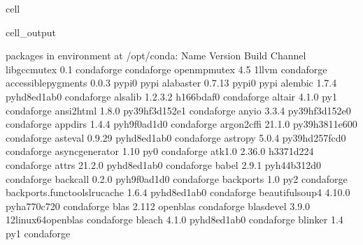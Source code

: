 \documentclass[letterpaper,table,10pt,english]{jupyterBook}
\begin{document}
\begin{sphinxuseclass}{cell}
\begin{sphinxVerbatimOutput}
\begin{sphinxuseclass}{cell_output}
\begin{sphinxVerbatim}[commandchars=\\\{\}]
\PYGZsh{} packages in environment at /opt/conda:
\PYGZsh{}
\PYGZsh{} Name                    Version                   Build  Channel
\PYGZus{}libgcc\PYGZus{}mutex             0.1                 conda\PYGZus{}forge    conda\PYGZhy{}forge
\PYGZus{}openmp\PYGZus{}mutex             4.5                      1\PYGZus{}llvm    conda\PYGZhy{}forge
accessible\PYGZhy{}pygments       0.0.3                    pypi\PYGZus{}0    pypi
alabaster                 0.7.13                   pypi\PYGZus{}0    pypi
alembic                   1.7.4              pyhd8ed1ab\PYGZus{}0    conda\PYGZhy{}forge
alsa\PYGZhy{}lib                  1.2.3.2              h166bdaf\PYGZus{}0    conda\PYGZhy{}forge
altair                    4.1.0                      py\PYGZus{}1    conda\PYGZhy{}forge
ansi2html                 1.8.0            py39hf3d152e\PYGZus{}1    conda\PYGZhy{}forge
anyio                     3.3.4            py39hf3d152e\PYGZus{}0    conda\PYGZhy{}forge
appdirs                   1.4.4              pyh9f0ad1d\PYGZus{}0    conda\PYGZhy{}forge
argon2\PYGZhy{}cffi               21.1.0           py39h3811e60\PYGZus{}0    conda\PYGZhy{}forge
asteval                   0.9.29             pyhd8ed1ab\PYGZus{}0    conda\PYGZhy{}forge
astropy                   5.0.4            py39hd257fcd\PYGZus{}0    conda\PYGZhy{}forge
async\PYGZus{}generator           1.10                       py\PYGZus{}0    conda\PYGZhy{}forge
atk\PYGZhy{}1.0                   2.36.0               h3371d22\PYGZus{}4    conda\PYGZhy{}forge
attrs                     21.2.0             pyhd8ed1ab\PYGZus{}0    conda\PYGZhy{}forge
babel                     2.9.1              pyh44b312d\PYGZus{}0    conda\PYGZhy{}forge
backcall                  0.2.0              pyh9f0ad1d\PYGZus{}0    conda\PYGZhy{}forge
backports                 1.0                        py\PYGZus{}2    conda\PYGZhy{}forge
backports.functools\PYGZus{}lru\PYGZus{}cache 1.6.4              pyhd8ed1ab\PYGZus{}0    conda\PYGZhy{}forge
beautifulsoup4            4.10.0             pyha770c72\PYGZus{}0    conda\PYGZhy{}forge
blas                      2.112                  openblas    conda\PYGZhy{}forge
blas\PYGZhy{}devel                3.9.0           12\PYGZus{}linux64\PYGZus{}openblas    conda\PYGZhy{}forge
bleach                    4.1.0              pyhd8ed1ab\PYGZus{}0    conda\PYGZhy{}forge
blinker                   1.4                        py\PYGZus{}1    conda\PYGZhy{}forge

\end{sphinxVerbatim}
\end{sphinxuseclass}
\end{sphinxVerbatimOutput}
\end{sphinxuseclass}
\end{document}
